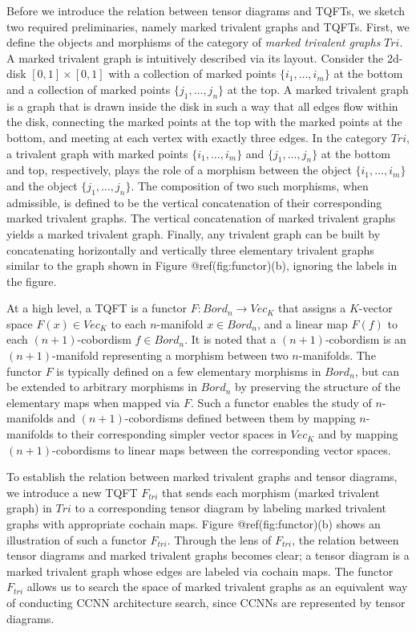 \documentclass[
  12pt,
]{krantz}
\begin{document}
Before we introduce the relation between tensor diagrams and TQFTs, we
sketch two required preliminaries, namely marked trivalent graphs and
TQFTs. First, we define the objects and morphisms of the category of
\emph{marked trivalent graphs} \(Tri\). A marked trivalent graph is
intuitively described via its layout. Consider the 2d-disk
\([0,1]\times [0,1]\) with a collection of marked points
\(\{i_1,\ldots,i_m\}\) at the bottom and a collection of marked points
\(\{j_1,\ldots,j_n\}\) at the top. A marked trivalent graph is a graph
that is drawn inside the disk in such a way that all edges flow within
the disk, connecting the marked points at the top with the marked points
at the bottom, and meeting at each vertex with exactly three edges. In
the category \(Tri\), a trivalent graph with marked points
\(\{i_1,\ldots,i_m\}\) and \(\{j_1,\ldots,j_n\}\) at the bottom and top,
respectively, plays the role of a morphism between the object
\(\{i_1,\ldots,i_m\}\) and the object \(\{j_1,\ldots,j_n\}\). The
composition of two such morphisms, when admissible, is defined to be the
vertical concatenation of their corresponding marked trivalent graphs.
The vertical concatenation of marked trivalent graphs yields a marked
trivalent graph. Finally, any trivalent graph can be built by
concatenating horizontally and vertically three elementary trivalent
graphs similar to the graph shown in Figure @ref(fig:functor)(b),
ignoring the labels in the figure.

At a high level, a TQFT is a functor \(F\colon Bord_{n}\to Vec_{K}\)
that assigns a \(K\)-vector space \(F(x)\in Vec_{K}\) to each
\(n\)-manifold \(x \in Bord_{n}\), and a linear map \(F(f)\) to each
\((n+1)\)-cobordism \(f \in Bord_{n}\). It is noted that a
\((n+1)\)-cobordism is an \((n+1)\)-manifold representing a morphism
between two \(n\)-manifolds. The functor \(F\) is typically defined on a
few elementary morphisms in \(Bord_{n}\), but can be extended to
arbitrary morphisms in \(Bord_{n}\) by preserving the structure of the
elementary maps when mapped via \(F\). Such a functor enables the study
of \(n\)-manifolds and \((n+1)\)-cobordisms defined between them by
mapping \(n\)-manifolds to their corresponding simpler vector spaces in
\(Vec_{K}\) and by mapping \((n+1)\)-cobordisms to linear maps between
the corresponding vector spaces.

To establish the relation between marked trivalent graphs and tensor
diagrams, we introduce a new TQFT \(F_{tri}\) that sends each morphism
(marked trivalent graph) in \(Tri\) to a corresponding tensor diagram by
labeling marked trivalent graphs with appropriate cochain maps. Figure
@ref(fig:functor)(b) shows an illustration of such a functor
\(F_{tri}\). Through the lens of \(F_{tri}\), the relation between
tensor diagrams and marked trivalent graphs becomes clear; a tensor
diagram is a marked trivalent graph whose edges are labeled via cochain
maps. The functor \(F_{tri}\) allows us to search the space of marked
trivalent graphs as an equivalent way of conducting CCNN architecture
search, since CCNNs are represented by tensor diagrams.
\end{document}
